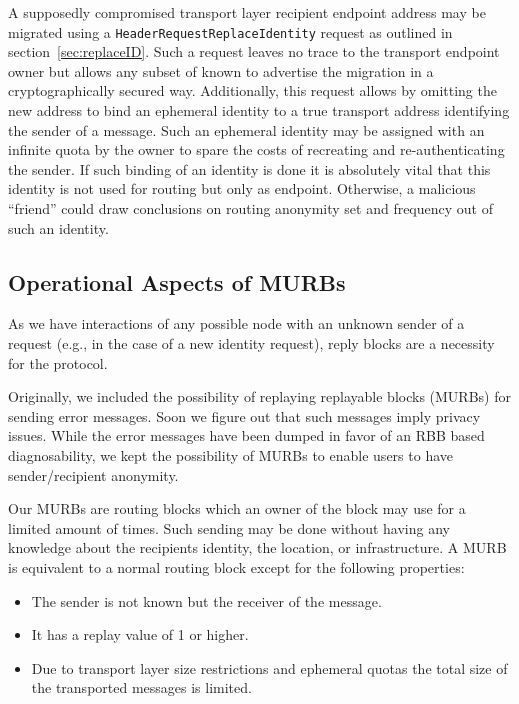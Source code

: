A supposedly compromised transport layer recipient endpoint address may be migrated using a \texttt{HeaderRequestReplaceIdentity} request as outlined in section~\ref{sec:replaceID}. Such a request leaves no trace to the transport endpoint owner but allows any subset of known \VortexNode{} to advertise the migration in a cryptographically secured way. Additionally, this request allows by omitting the new address to bind an ephemeral identity to a true transport address identifying the sender of a message. Such an ephemeral identity may be assigned with an infinite quota by the owner to spare the costs of recreating and re-authenticating the sender. If such binding of an identity is done it is absolutely vital that this identity is not used for routing but only as endpoint. Otherwise, a malicious ``friend'' could draw conclusions on routing anonymity set and frequency out of such an identity.

\subsection{Operational Aspects of MURBs\label{sec:murb}}
As we have interactions of any possible node with an unknown sender of a request (e.g., in the case of a new identity request), reply blocks are a necessity for the \MessageVortex{} protocol.

Originally, we included the possibility of replaying replayable blocks (MURBs) for sending error messages. Soon we figure out that such messages imply privacy issues. While the error messages have been dumped in favor of an RBB based diagnosability, we kept the possibility of MURBs to enable users to have sender/recipient anonymity. 

Our MURBs are routing blocks which an owner of the block may use for a limited amount of times. Such sending may be done without having any knowledge about the recipients identity, the location, or infrastructure. A MURB is equivalent to a normal routing block except for the following properties:

\begin{itemize}
	\item The sender is not known but the receiver of the message.
	\item It has a replay value of 1 or higher.
	\item Due to transport layer size restrictions and ephemeral quotas the total size of the transported messages is limited.
\end{itemize}

